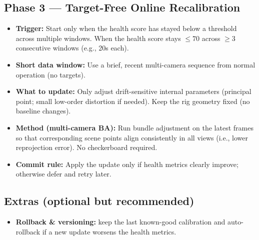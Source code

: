 \documentclass[12pt]{scrartcl}
\begin{document}
\subsection*{Phase 3 — Target-Free Online Recalibration}
\begin{itemize}
  \item \textbf{Trigger:} Start only when the health score has stayed below a threshold across multiple windows. When the health score stays $\leq 70$ across $\geq 3$ consecutive windows (e.g., 20s each).
  \item \textbf{Short data window:} Use a brief, recent multi-camera sequence from normal operation (no targets).
  \item \textbf{What to update:} Only adjust drift-sensitive internal parameters (principal point; small low-order distortion if needed). Keep the rig geometry fixed (no baseline changes).
  \item \textbf{Method (multi-camera BA):} Run bundle adjustment on the latest frames so that corresponding scene points align consistently in all views (i.e., lower reprojection error). No checkerboard required.
  \item \textbf{Commit rule:} Apply the update only if health metrics clearly improve; otherwise defer and retry later.
\end{itemize}

\subsection*{Extras (optional but recommended)}
\begin{itemize}
  \item \textbf{Rollback \& versioning:} keep the last known-good calibration and auto-rollback if a new update worsens the health metrics.
\end{itemize}
\end{document}
